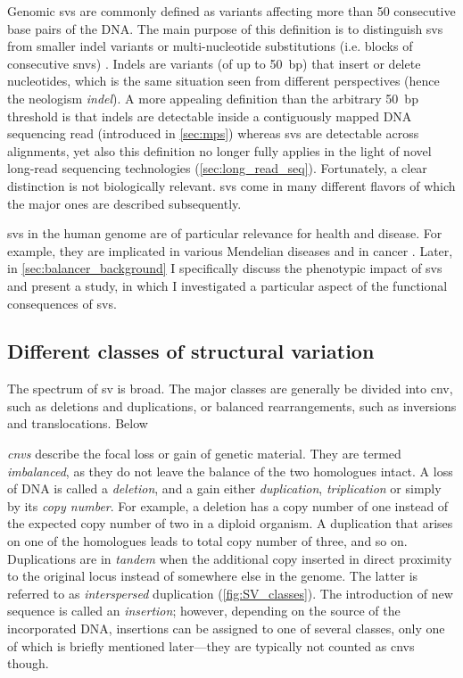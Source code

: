 Genomic \acfp{sv} are commonly defined as variants affecting more than
50 consecutive base pairs of the DNA. The main purpose of this definition is to
distinguish \acp{sv} from smaller indel variants or multi-nucleotide substitutions
(i.e. blocks of consecutive \acp{snv}) \citep{Alkan2011}. Indels are variants
(of up to 50~bp) that insert or delete nucleotides, which is the same situation
seen from different perspectives (hence the neologism \textit{indel}).
A more appealing definition than the arbitrary 50~bp threshold is that indels
are detectable inside a contiguously mapped DNA sequencing read (introduced in
\cref{sec:mps}) whereas \acp{sv} are detectable across alignments, yet also
this definition no longer fully applies in the light of novel long-read
sequencing technologies (\cref{sec:long_read_seq}). Fortunately, a clear
distinction is not biologically relevant. \Acp{sv} come in many different
flavors of which the major ones are described subsequently.

\Acp{sv} in the human genome are of particular relevance for health and disease.
For example, they are implicated in various Mendelian diseases and in cancer
\citep{Weischenfeldt2013}.
Later, in \cref{sec:balancer_background} I specifically discuss the phenotypic
impact of \acp{sv} and present a study, in which I investigated a particular
aspect of the functional consequences of \acp{sv}.




\subsection{Different classes of structural variation}
\label{sec:sv_classes}

The spectrum of \acl{sv} is broad. The major \sv classes are generally be
divided into \acl{cnv}, such as deletions and
duplications, or balanced rearrangements, such as inversions and translocations.
Below

\emph{\Acfp{cnv}} describe the focal loss or gain of genetic material. They are
termed \emph{imbalanced}, as they do not leave the balance of the two homologues
intact. A loss of DNA is called a \emph{deletion}, and a gain either
\emph{duplication}, \emph{triplication} or simply by its \emph{copy number}.
For example, a deletion has a copy number of one instead of the expected copy
number of two in a diploid organism. A duplication that arises on one of the
homologues leads to total copy number of three, and so on.
Duplications are in \emph{tandem} when the additional copy inserted in direct
proximity to the original locus instead of somewhere else in the genome. The
latter is referred to as \emph{interspersed} duplication (\cref{fig:SV_classes}).
The introduction of new sequence is called an \emph{insertion}; however,
depending on the source of the incorporated DNA, insertions can be assigned to
one of several classes, only one of which is briefly mentioned later---they are
typically not counted as \acp{cnv} though.

